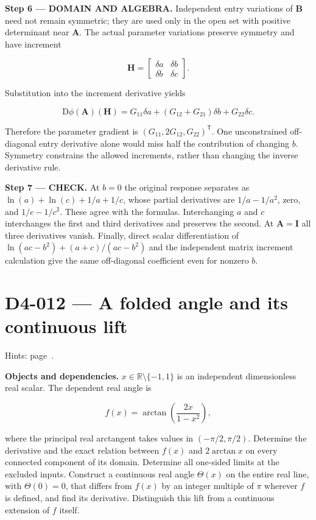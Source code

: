 \documentclass[11pt,oneside,openany]{book}
\begin{document}
\begin{DomainStep}
\textbf{Step 6 --- DOMAIN AND ALGEBRA.} Independent entry variations of \(\mathbf B\) need not remain symmetric; they are used only in the open set with positive determinant near \(\mathbf A\). The actual parameter variations preserve symmetry and have increment

\[
\mathbf H=\begin{bmatrix}\delta a&\delta b\\\delta b&\delta c\end{bmatrix}.
\]

Substitution into the increment derivative yields

\[
\mathrm D\phi(\mathbf A)(\mathbf H)
=G_{11}\delta a+(G_{12}+G_{21})\delta b+G_{22}\delta c.
\]

Therefore the parameter gradient is \((G_{11},2G_{12},G_{22})^{\mathsf T}\). One unconstrained off-diagonal entry derivative alone would miss half the contribution of changing \(b\). Symmetry constrains the allowed increments, rather than changing the inverse derivative rule.

\end{DomainStep}
\textbf{Step 7 --- CHECK.} At \(b=0\) the original response separates as \(\ln(a)+\ln(c)+1/a+1/c\), whose partial derivatives are \(1/a-1/a^2\), zero, and \(1/c-1/c^2\). These agree with the formulas. Interchanging \(a\) and \(c\) interchanges the first and third derivatives and preserves the second. At \(\mathbf A=\mathbf I\) all three derivatives vanish. Finally, direct scalar differentiation of \(\ln(ac-b^2)+(a+c)/(ac-b^2)\) and the independent matrix increment calculation give the same off-diagonal coefficient even for nonzero \(b\).
\clearpage
\section{D4-012 --- A folded angle and its continuous lift}
\label{problem:D4-012}
{\small Hints: page~\pageref{hints:D4-012}.}\par\medskip

\textbf{Objects and dependencies.} \(x\in\mathbb R\setminus\{-1,1\}\) is an independent dimensionless real scalar. The dependent real angle is

\[
f(x)=\arctan\left(\frac{2x}{1-x^2}\right),
\]

where the principal real arctangent takes values in \((-\pi/2,\pi/2)\). Determine the derivative and the exact relation between \(f(x)\) and \(2\arctan x\) on every connected component of its domain. Determine all one-sided limits at the excluded inputs. Construct a continuous real angle \(\Theta(x)\) on the entire real line, with \(\Theta(0)=0\), that differs from \(f(x)\) by an integer multiple of \(\pi\) wherever \(f\) is defined, and find its derivative. Distinguish this lift from a continuous extension of \(f\) itself.
\end{document}
